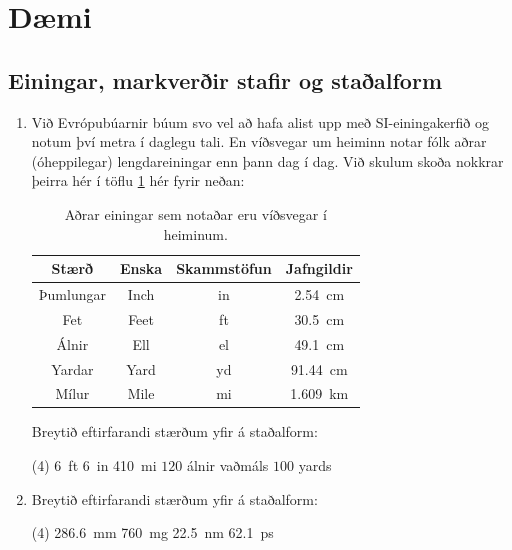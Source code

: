 \ifdefined \wholebook \else\documentclass[oneside]{book}\usepackage{EdlBook}\graphicspath{{figures/}}
\begin{document}
\section{Dæmi}


\subsection*{Einingar, markverðir stafir og staðalform}

\begin{enumerate}[label = \textbf{Dæmi \thechapter.\arabic*.}]

\item Við Evrópubúarnir búum svo vel að hafa alist upp með SI-einingakerfið og notum því metra í daglegu tali. En víðsvegar um heiminn notar fólk aðrar (óheppilegar) lengdareiningar enn þann dag í dag. Við skulum skoða nokkrar þeirra hér í töflu \ref{tafla:einingakerfi2} hér fyrir neðan:

\begin{table}[H]
    \centering
\begin{tabular}{|c|c|c|c|}
\hline

\textbf{Stærð} & \textbf{Enska} &  \textbf{Skammstöfun} & \textbf{Jafngildir} \\
\hline
Þumlungar & Inch & in & \SI{2.54}{cm} \\
Fet & Feet & ft & \SI{30.5}{cm} \\
Álnir & Ell  & el & \SI{49.1}{cm} \\
Yardar & Yard  & yd & \SI{91.44}{cm} \\
Mílur & Mile & mi & \SI{1.609}{km}  \\
\hline
\end{tabular}
\caption{Aðrar einingar sem notaðar eru víðsvegar í heiminum.}
\label{tafla:einingakerfi2}
\end{table}
\vspace{-0.4cm}
Breytið eftirfarandi stærðum yfir á staðalform:

    \begin{tasks}[label = {(\alph*)}, label-format={\bfseries}, label-offset = {0.4cm}](4)
          \task \SI{6}{ft} \SI{6}{in}
          \task \SI{410}{mi}
          \task $120$ álnir vaðmáls
          \task $100$ yards
    \end{tasks}
    
\item Breytið eftirfarandi stærðum yfir á staðalform:

    \begin{tasks}[label = {(\alph*)}, label-format={\bfseries}, label-offset = {0.4cm}](4)
          \task \SI{286.6}{mm}
          \task \SI{760}{mg}
          \task \SI{22.5}{nm}
          \task \SI{62.1}{ps}
    \end{tasks}


\end{enumerate}
\end{document}

